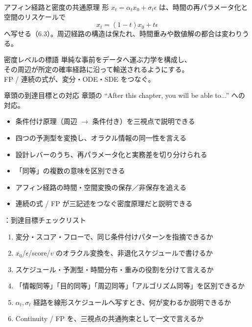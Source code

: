 \asmain
\begin{frame}{アフィン経路と密度の共通原理}
    形 $x_t=\alpha_t x_0+\sigma_t\epsilon$ は、時間の再パラメータ化と空間のリスケールで
    \[
        x_t=(1-t)x_0+t\epsilon
    \]
    へ写せる（6.3）。周辺経路の構造は保たれ、時間重みや数値解の都合は変わりうる。
    \begin{block}{密度レベルの標語}
        単純な事前をデータへ運ぶ力学を構成し、\\
        その周辺が所定の確率経路に沿って輸送されるようにする。\\
        FP / 連続の式が、変分・ODE・SDE をつなぐ。
    \end{block}
\end{frame}
\asmain
\begin{frame}{章頭の到達目標との対応}
    章頭の ``After this chapter, you will be able to...'' への対応。
    \begin{itemize}
        \item 条件付け原理（周辺 $\to$ 条件付き）を三視点で説明できる
        \item 四つの予測型を変換し、オラクル情報の同一性を言える
        \item 設計レバーのうち、再パラメータ化と実務差を切り分けられる
        \item 「同等」の複数の意味を区別できる
        \item アフィン経路の時間・空間変換の保存／非保存を追える
        \item 連続の式 / FP が三記述をつなぐ密度原理だと説明できる
    \end{itemize}
\end{frame}
\assuppl
\begin{frame}{\supplmark：到達目標チェックリスト}
    \footnotesize
    \begin{enumerate}
        \item 変分・スコア・フローで、同じ条件付けパターンを指摘できるか
        \item $x_0$/$\epsilon$/score/$v$ のオラクル変換を、非退化スケジュールで書けるか
        \item スケジュール・予測型・時間分布・重みの役割を分けて言えるか
        \item 「情報同等」「目的同等」「周辺同等」「アルゴリズム同等」を区別できるか
        \item $\alpha_t,\sigma_t$ 経路を線形スケジュールへ写すとき、何が変わるか説明できるか
        \item Continuity / FP を、三視点の共通拘束として一文で言えるか
    \end{enumerate}
\end{frame}
